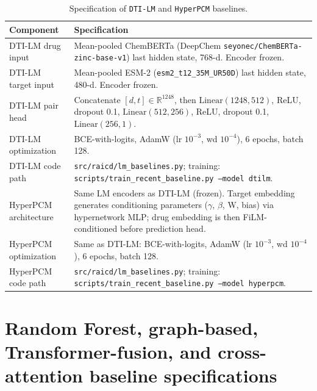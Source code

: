 \documentclass[referee,pdflatex,sn-basic,Numbered]{sn-jnl}
\begin{document}
\begin{appendices}
\begin{table}[t]
  \centering
  \scriptsize
  \caption{Specification of \texttt{DTI-LM} and \texttt{HyperPCM} baselines.}
  \label{tab:lm-spec}
  \setlength{\tabcolsep}{3.5pt}
  \begin{tabular*}{\textwidth}{@{\extracolsep{\fill}}lp{}@{}}
    \toprule
    Component & Specification \\
    \midrule
    DTI-LM drug input & Mean-pooled ChemBERTa (DeepChem \texttt{seyonec/ChemBERTa-zinc-base-v1}) last hidden state, 768-d. Encoder frozen. \\
    DTI-LM target input & Mean-pooled ESM-2 (\texttt{esm2\_t12\_35M\_UR50D}) last hidden state, 480-d. Encoder frozen. \\
    DTI-LM pair head & Concatenate $[d, t] \in \mathbb{R}^{1248}$, then $\mathrm{Linear}(1248,512)$, ReLU, dropout 0.1, $\mathrm{Linear}(512,256)$, ReLU, dropout 0.1, $\mathrm{Linear}(256,1)$. \\
    DTI-LM optimization & BCE-with-logits, AdamW (lr $10^{-3}$, wd $10^{-4}$), 6 epochs, batch 128. \\
    DTI-LM code path & \texttt{src/raicd/lm\_baselines.py}; training: \texttt{scripts/train\_recent\_baseline.py --model dtilm}. \\
    \midrule
    HyperPCM architecture & Same LM encoders as DTI-LM (frozen). Target embedding generates conditioning parameters ($\gamma$, $\beta$, W, bias) via hypernetwork MLP; drug embedding is then FiLM-conditioned before prediction head. \\
    HyperPCM optimization & Same as DTI-LM: BCE-with-logits, AdamW (lr $10^{-3}$, wd $10^{-4}$), 6 epochs, batch 128. \\
    HyperPCM code path & \texttt{src/raicd/lm\_baselines.py}; training: \texttt{scripts/train\_recent\_baseline.py --model hyperpcm}. \\
    \bottomrule
  \end{tabular*}
\end{table}

\section{Random Forest, graph-based, Transformer-fusion, and cross-attention baseline specifications}


\end{appendices}
\end{document}
